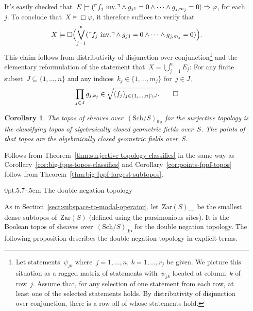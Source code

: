 \documentclass[10pt,reqno,a4paper]{amsbook}
\makeatletter
\theoremstyle{definition}
\theoremstyle{plain}
\newtheorem{cor}[defn]{Corollary}
\theoremstyle{remark}
\newcommand{\Zar}{\mathrm{Zar}}
\newcommand{\Sch}{\mathrm{Sch}}
\newcommand{\lfp}{\mathrm{lfp}}
\newcommand{\?}{\,{:}\,}
\renewcommand{\_}{\mathpunct{.}\,}
\newcommand{\speak}[1]{\ulcorner\text{\textnormal{#1}}\urcorner}
\newcommand{\inv}{inv.\@}
\renewenvironment{proof}[1][\proofname]{\par
  \pushQED{\qed}%
  \normalfont \topsep6\p@\@plus6\p@\relax
  \trivlist
  \item[\hskip\labelsep
        \itshape
    #1\@addpunct{.}]\ignorespaces
}{%
  \popQED\endtrivlist\@endpefalse
}
\def\subsection{\@startsection{subsection}{2}%
  {0pt}{.5\linespacing\@plus.7\linespacing}{-.5em}%
  {\normalfont\bfseries}}
\makeatother
\begin{document}
\begin{proof}
It's easily checked that~$E \models (\speak{$f_j$ \inv} \wedge g_{j1} = 0
\wedge \cdots \wedge g_{j,m_j} = 0) \Rightarrow \varphi$, for each~$j$. To
conclude that~$X \models \Box\varphi$, it therefore suffices to verify that
\[ X \models \Box\Bigl(\bigvee_{j=1}^n (\speak{$f_j$ \inv} \wedge
  g_{j1} = 0 \wedge \cdots \wedge g_{j,m_j} = 0)\Bigr). \]
This claim follows from distributivity of disjunction over conjunction\footnote{Let
statements~$\psi_{jk}$ where~$j = 1,\ldots,n$, $k = 1,\ldots,r_j$ be given.
We picture this situation as a ragged matrix of statements with~$\psi_{jk}$ located
at column~$k$ of row~$j$. Assume that, for any selection of one statement from
each row, at least one of the selected statements holds. By distributivity of
disjunction over conjunction, there is a row all of whose statements hold.}
and the elementary reformulation of the statement that~$X = \bigcup_{j=1}^n
E_j$: For any finite subset~$J \subseteq \{1,\ldots,n\}$ and any indices~$k_j
\in \{ 1, \ldots, m_j \}$ for~$j \in J$,
\[ \prod_{j \in J} g_{j, k_j} \in \sqrt{(f_j)_{j \in \{1,\ldots,n\} \setminus J}}. \qedhere \]
\end{proof}

\begin{cor}The topos of sheaves over~$(\Sch/S)_\lfp$ for the surjective
topology is the classifying topos of algebraically closed geometric fields
over~$S$. The points of that topos are the algebraically closed geometric
fields over~$S$.\end{cor}

\begin{proof}Follows from Theorem~\ref{thm:surjective-topology-classifies} in
the same way as Corollary~\ref{cor:big-fpps-topos-classifies} and
Corollary~\ref{cor:points-fppf-topos} follow from
Theorem~\ref{thm:big-fppf-largest-subtopos}.
\end{proof}


\subsection{The double negation topology}

As in Section~\ref{sect:subspace-to-modal-operator}, let~$\Zar(S)_{\neg\neg}$
be the smallest dense subtopos of~$\Zar(S)$ (defined using the parsimonious
sites). It is the Boolean topos of sheaves over~$(\Sch/S)_\lfp$ for the double
negation topology. The following proposition describes the double
negation topology in explicit terms.
\end{document}
